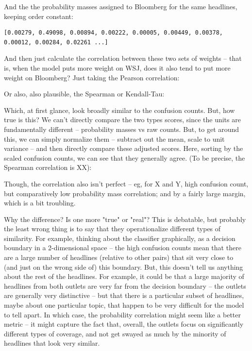 \documentclass{scrartcl}
\begin{document}
And the the probability masses assigned to Bloomberg for the same headlines, keeping order constant:

\begin{lstlisting}
[0.00279, 0.49098, 0.00894, 0.00222, 0.00005, 0.00449, 0.00378, 0.00012, 0.00284, 0.02261 ...]
\end{lstlisting}

And then just calculate the correlation between these two sets of weights -- that is, when the model puts more weight on WSJ, does it also tend to put more weight on Bloomberg? Just taking the Pearson correlation:


Or also, also plausible, the Spearman or Kendall-Tau:


Which, at first glance, look broadly similar to the confusion counts. But, how true is this? We can't directly compare the two types scores, since the units are fundamentally different -- probability masses vs raw counts. But, to get around this, we can simply normalize them -- subtract out the mean, scale to unit variance -- and then directly compare these adjusted scores. Here, sorting by the scaled confusion counts, we can see that they generally agree. (To be precise, the Spearman correlation is XX):


Though, the correlation also isn't perfect -- eg, for X and Y, high confusion count, but comparatively low probability mass correlation; and by a fairly large margin, which is a bit troubling.

Why the difference? Is one more "true" or "real"? This is debatable, but probably the least wrong thing is to say that they operationalize different types of similarity. For example, thinking about the classifier graphically, as a decision boundary in a 2-dimensional space -- the high confusion counts mean that there are a large number of headlines (relative to other pairs) that sit very close to (and just on the wrong side of) this boundary. But, this doesn't tell us anything about the rest of the headlines. For example, it could be that a large majority of headlines from both outlets are very far from the decision boundary -- the outlets are generally very distinctive -- but that there is a particular subset of headlines, maybe about one particular topic, that happen to be very difficult for the model to tell apart. In which case, the probability correlation might seem like a better metric -- it might capture the fact that, overall, the outlets focus on significantly different types of coverage, and not get swayed as much by the minority of headlines that look very similar.
\end{document}
